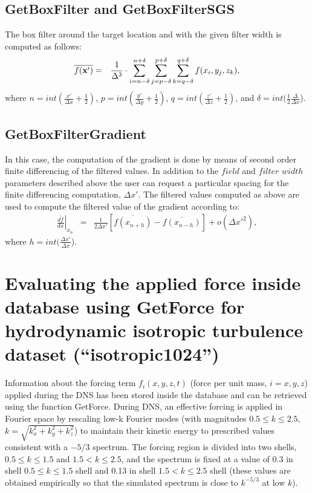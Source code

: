 \documentclass[11pt]{article}
\def\bea{\begin{eqnarray}}
\def\eea{\end{eqnarray}}
\begin{document}
\subsection{GetBoxFilter and GetBoxFilterSGS}
The box filter around the target location and with the given filter width is computed as follows:
\bea \overline{f({\bf x'})} &=& \frac{1}{\Delta^3} \cdot
\sum_{i=n - \delta}^{n + \delta}\sum_{j=p - \delta}^{p + \delta}\sum_{k=q - \delta}^{q + \delta}f(x_{i},y_{j},z_{k}),\eea
where $n=int(\frac{x'}{\Delta x}+\frac{1}{2})$, $p=int(\frac{y'}{\Delta
y}+\frac{1}{2})$, $q=int(\frac{z'}{\Delta z}+\frac{1}{2})$, and $\delta = int(\frac{1}{2}\frac{\Delta}{\Delta x}$).

\subsection{GetBoxFilterGradient}
In this case, the computation of the gradient is done by means of second order finite differencing of the filtered values. 
In addition to the $field$ and $filter$ $width$ parameters described above the user can request a particular spacing for 
the finite differencing computation, $\Delta x'$. The filtered values computed as above are used to compute the filtered
value of the gradient according to:
\bea \left.\overline{\frac{df}{dx}}\right|_{x_n}
&=& \frac{1}{2\Delta x'}[\overline{f(x_{n+h})}-\overline{f(x_{n-h})}] +o({\Delta x'}^2), \eea
where $h = int(\frac{\Delta x'}{\Delta x}$).

\section{Evaluating the applied force inside database using GetForce for hydrodynamic isotropic turbulence dataset (``isotropic1024'')}

Information about the forcing term $f_i(x,y,z,t)$ (force per unit mass, $i=x,y,z$) applied during the DNS has been stored inside the database and can be retrieved using the function GetForce. During DNS, an effective forcing is applied in Fourier space by rescaling low-k Fourier modes (with magnitudes $0.5\leq k\leq 2.5$, $k=\sqrt{k_x^2+k_y^2+k_z^2}$) to maintain their kinetic energy to prescribed values consistent with a $-5/3$ spectrum. The forcing region is divided into two shells,
$0.5\leq k\leq 1.5$ and $1.5<k\leq 2.5$, and the spectrum is fixed at a value of $0.3$ in shell $0.5\leq k\leq 1.5$ shell and 0.13 in shell $1.5<k\leq 2.5$ shell (these values are obtained empirically so that the simulated spectrum is close to $k^{-5/3}$ at low $k$).
\end{document}
